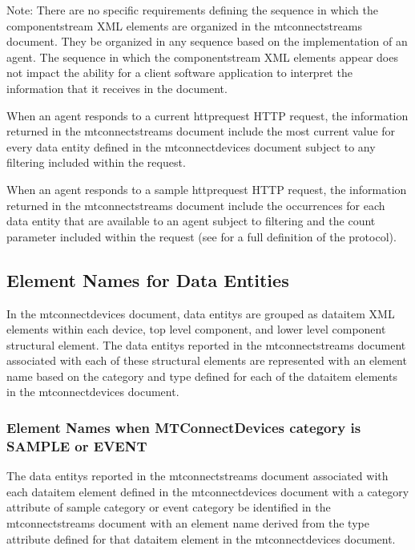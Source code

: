 \documentclass{mtconnect}	%
\begin{document}
\begin{note}
Note: There are no specific requirements defining the sequence in which the \gls{componentstream} XML elements are organized in the \gls{mtconnectstreams} document.  They \may be organized in any sequence based on the implementation of an \gls{agent}.  The sequence in which the \gls{componentstream} XML elements appear does not impact the ability for a client software application to interpret the information that it receives in the document.
\end{note}

When an \gls{agent} responds to a  \gls{current httprequest} HTTP request, the information returned in the \gls{mtconnectstreams} document \must include the most current value for every \gls{data entity} defined in the \gls{mtconnectdevices} document subject to any filtering included within the request.

When an \gls{agent} responds to a \gls{sample httprequest} HTTP request, the information returned in the \gls{mtconnectstreams} document \must include the occurrences for each \gls{data entity} that are available to an \gls{agent} subject to filtering and the count parameter included within the request (see  for a full definition of the protocol). 

\subsection{Element Names for Data Entities}

In the \gls{mtconnectdevices} document, \glspl{data entity} are grouped as \gls{dataitem} XML elements within each \gls{device}, \gls{top level} \gls{component}, and \gls{lower level} \gls{component} \gls{structural element}.  The \glspl{data entity} reported in the \gls{mtconnectstreams} document associated with each of these \glspl{structural element} are represented with an \gls{element name} based on the \gls{category} and \gls{type} defined for each of the \gls{dataitem} elements in the \gls{mtconnectdevices} document.

\subsubsection{Element Names when MTConnectDevices category is SAMPLE or EVENT}

The \glspl{data entity} reported in the \gls{mtconnectstreams} document associated with each \gls{dataitem} element defined in the \gls{mtconnectdevices} document with a \gls{category} attribute of \gls{sample category} or \gls{event category} \must be identified in the \gls{mtconnectstreams} document with an \gls{element name} derived from the \gls{type} attribute defined for that \gls{dataitem} element in the \gls{mtconnectdevices} document.
\end{document}
